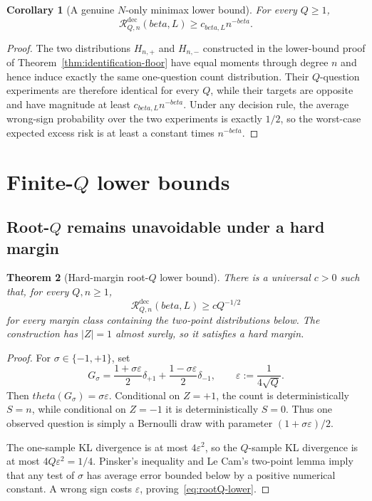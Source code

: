 \documentclass[11pt]{article}
\def\beta{beta}%
\def\theta{theta}%
\newtheorem{theorem}{Theorem}[section]
\newtheorem{corollary}[theorem]{Corollary}
\newcommand{\calR}{\mathcal R}
\newcommand{\eps}{\varepsilon}
\begin{document}
\begin{corollary}[A genuine $N$-only minimax lower bound]
\label{cor:N-only-lower}
For every $Q\ge1$,
\[
\calR^{\mathrm{dec}}_{Q,n}(\beta,L)
\ge c_{\beta,L}n^{-\beta}.
\]
\end{corollary}

\begin{proof}
The two distributions $H_{n,+}$ and $H_{n,-}$ constructed in the lower-bound proof of Theorem~\ref{thm:identification-floor} have equal moments through degree $n$ and hence induce exactly the same one-question count distribution.  Their $Q$-question experiments are therefore identical for every $Q$, while their targets are opposite and have magnitude at least $c_{\beta,L}n^{-\beta}$.  Under any decision rule, the average wrong-sign probability over the two experiments is exactly $1/2$, so the worst-case expected excess risk is at least a constant times $n^{-\beta}$.
\end{proof}

\section{Finite-$Q$ lower bounds}

\subsection{Root-$Q$ remains unavoidable under a hard margin}

\begin{theorem}[Hard-margin root-$Q$ lower bound]
\label{thm:rootQ-lower}
There is a universal $c>0$ such that, for every $Q,n\ge1$,
\begin{equation}
\label{eq:rootQ-lower}
\calR^{\mathrm{dec}}_{Q,n}(\beta,L)
\ge cQ^{-1/2}
\end{equation}
for every margin class containing the two-point distributions below.  The construction has $|Z|=1$ almost surely, so it satisfies a hard margin.
\end{theorem}

\begin{proof}
For $\sigma\in\{-1,+1\}$, set
\[
G_\sigma
=
\frac{1+\sigma\eps}{2}\delta_{+1}
+
\frac{1-\sigma\eps}{2}\delta_{-1},
\qquad
\eps:=\frac{1}{4\sqrt Q}.
\]
Then $\theta(G_\sigma)=\sigma\eps$.  Conditional on $Z=+1$, the count is deterministically $S=n$, while conditional on $Z=-1$ it is deterministically $S=0$.  Thus one observed question is simply a Bernoulli draw with parameter $(1+\sigma\eps)/2$.

The one-sample KL divergence is at most $4\eps^2$, so the $Q$-sample KL divergence is at most $4Q\eps^2=1/4$.  Pinsker's inequality and Le Cam's two-point lemma imply that any test of $\sigma$ has average error bounded below by a positive numerical constant.  A wrong sign costs $\eps$, proving~\eqref{eq:rootQ-lower}.
\end{proof}
\end{document}
